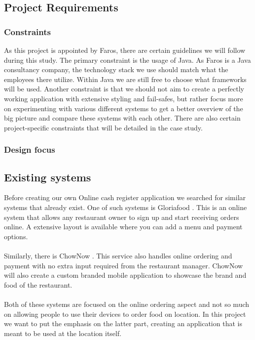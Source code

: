 \documentclass[12pt]{article}
\begin{document}
\subsection{Project Requirements}
\subsubsection{Constraints}
As this project is appointed by Faros, there are certain guidelines we will follow during this study. The primary constraint is the usage of Java. As Faros is a Java consultancy company, the technology stack we use should match what the employees there utilize. Within Java we are still free to choose what frameworks will be used. Another constraint is that we should not aim to create a perfectly working application with extensive styling and fail-safes, but rather focus more on experimenting with various different systems to get a better overview of the big picture and compare these systems with each other. There are also certain project-specific constraints that will be detailed in the case study.
\subsubsection{Design focus}


\subsection{Existing systems}
Before creating our own Online cash register application we searched for similar systems that already exist. One of such systems is Gloriafood \cite{Gloriafood:online}. This is an online system that allows any restaurant owner to sign up and start receiving orders online. A extensive layout is available where you can add a menu and payment options.
\\\\
Similarly, there is ChowNow \cite{Chownow:online}. This service also handles online ordering and payment with no extra input required from the restaurant manager. ChowNow will also create a custom branded mobile application to showcase the brand and food of the restaurant.
\\\\
Both of these systems are focused on the online ordering aspect and not so much on allowing people to use their devices to order food on location. In this project we want to put the emphasis on the latter part, creating an application that is meant to be used at the location itself.
\end{document}
